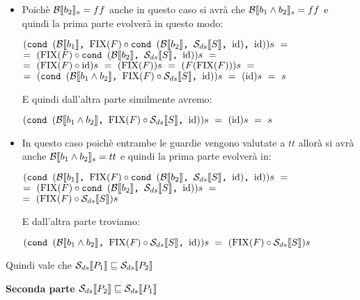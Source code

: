 {\begin{itemize}
        \item {} Poichè 
        $\evalBbs{b_2}{s}=ff$ anche in questo caso si avrà che 
        $\evalBbs{b_1\and{}b_2}{s}=ff$ e quindi la prima parte evolverà in
        questo modo:
        \begin{center}
        $(\cond{b_1}{\fixp{F} \circ \cond{b_2}{\Sds}{\idDS}}{\idDS})s~=$\\
        $=~(\fixp{F} \circ \cond{b_2}{\Sds}{\idDS})s~=$\\
        $=~(\fixp{F} \circ \idDS)s~=~(\fixp{F})s~=~(F(\fixp{F}))s~=$\\
        $=~(\cond{b_1\and{}b_2}{\fixp{F} \circ \Sds}{\idDS})s~=~(\idDS)s~=~s$
        \end{center}
        E quindi dall'altra parte similmente avremo:
        \begin{center}
        $(\cond{b_1\and{}b_2}{\fixp{F} \circ \Sds}{\idDS})s~=~(\idDS)s~=~s$
        \end{center}

        \item {} In questo
        caso poichè entrambe le guardie vengono valutate a $tt$ allorà si avrà
        anche $\evalBbs{b_1\and{}b_2}{s}=tt$ e quindi la prima parte evolverà
        in:
        \begin{center}
        $(\cond{b_1}{\fixp{F} \circ \cond{b_2}{\Sds}{\idDS}}{\idDS})s~=$\\
        $=~(\fixp{F} \circ \cond{b_2}{\Sds}{\idDS})s~=$\\
        $=~(\fixp{F} \circ \Sds)s$
        \end{center}
        E dall'altra parte troviamo:
        \begin{center}
        $(\cond{b_1\and{}b_2}{\fixp{F} \circ \Sds}{\idDS})s~
        =~(\fixp{F} \circ \Sds)s$
        \end{center}
    \end{itemize}
    Quindi vale che $\dsCtxt{P_1} \mineq \dsCtxt{P_2}$

    \textbf{Seconda parte $\dsCtxt{P_2} \mineq \dsCtxt{P_1}$}
}
\newpage